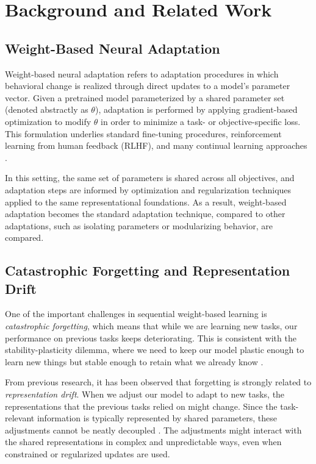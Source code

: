 \documentclass[10pt]{article}
\begin{document}
	
	\section{Background and Related Work}
	\label{sec:related_work}
	
	\subsection{Weight-Based Neural Adaptation}
	\label{sec:weight_based_adaptation}
	
	Weight-based neural adaptation refers to adaptation procedures in which behavioral change is realized through direct updates to a model’s parameter vector. Given a pretrained model parameterized by a shared parameter set (denoted abstractly as $\theta$), adaptation is performed by applying gradient-based optimization to modify $\theta$ in order to minimize a task- or objective-specific loss. This formulation underlies standard fine-tuning procedures, reinforcement learning from human feedback (RLHF), and many continual learning approaches \cite{kirkpatrick2017ewc,delange2021continual}.

	In this setting, the same set of parameters is shared across all objectives, and adaptation steps are informed by optimization and regularization techniques applied to the same representational foundations. As a result, weight-based adaptation becomes the standard adaptation technique, compared to other adaptations, such as isolating parameters or modularizing behavior, are compared.
	
	\subsection{Catastrophic Forgetting and Representation Drift}
	\label{sec:forgetting_drift}
	
	One of the important challenges in sequential weight-based learning is \emph{catastrophic forgetting}, which means that while we are learning new tasks, our performance on previous tasks keeps deteriorating. This is consistent with the stability-plasticity dilemma, where we need to keep our model plastic enough to learn new things but stable enough to retain what we already know \cite{kirkpatrick2017ewc,delange2021continual}.

	From previous research, it has been observed that forgetting is strongly related to \emph{representation drift}. When we adjust our model to adapt to new tasks, the representations that the previous tasks relied on might change. Since the task-relevant information is typically represented by shared parameters, these adjustments cannot be neatly decoupled \cite{kaushik2021rmn}. The adjustments might interact with the shared representations in complex and unpredictable ways, even when constrained or regularized updates are used.
\end{document}
